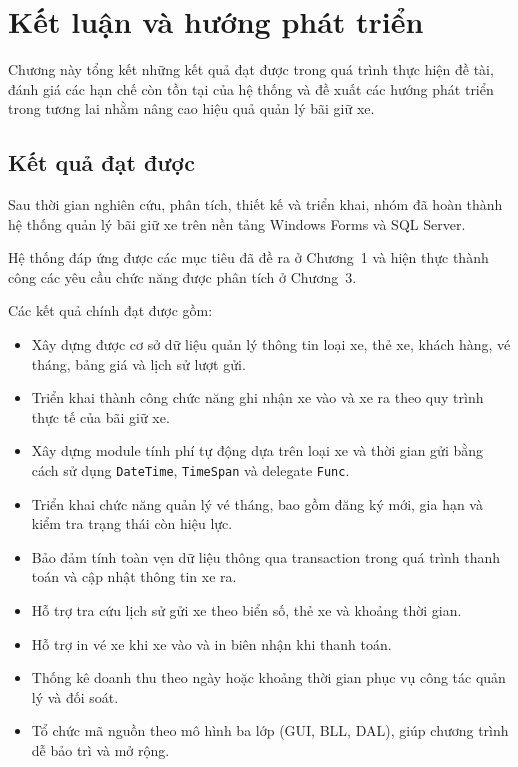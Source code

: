 \chapter{Kết luận và hướng phát triển}


Chương này tổng kết những kết quả đạt được trong quá trình thực hiện
đề tài, đánh giá các hạn chế còn tồn tại của hệ thống và đề xuất các
hướng phát triển trong tương lai nhằm nâng cao hiệu quả quản lý
bãi giữ xe.

\section{Kết quả đạt được}

Sau thời gian nghiên cứu, phân tích, thiết kế và triển khai, nhóm đã
hoàn thành hệ thống quản lý bãi giữ xe trên nền tảng Windows Forms
và SQL Server.

Hệ thống đáp ứng được các mục tiêu đã đề ra ở Chương~1 và hiện thực
thành công các yêu cầu chức năng được phân tích ở Chương~3.

Các kết quả chính đạt được gồm:

\begin{itemize}
    \item Xây dựng được cơ sở dữ liệu quản lý thông tin loại xe,
    thẻ xe, khách hàng, vé tháng, bảng giá và lịch sử lượt gửi.

    \item Triển khai thành công chức năng ghi nhận xe vào và xe ra
    theo quy trình thực tế của bãi giữ xe.

    \item Xây dựng module tính phí tự động dựa trên loại xe và thời
    gian gửi bằng cách sử dụng \texttt{DateTime}, \texttt{TimeSpan}
    và delegate \texttt{Func}.

    \item Triển khai chức năng quản lý vé tháng, bao gồm đăng ký mới,
    gia hạn và kiểm tra trạng thái còn hiệu lực.

    \item Bảo đảm tính toàn vẹn dữ liệu thông qua transaction trong
    quá trình thanh toán và cập nhật thông tin xe ra.

    \item Hỗ trợ tra cứu lịch sử gửi xe theo biển số, thẻ xe và
    khoảng thời gian.

    \item Hỗ trợ in vé xe khi xe vào và in biên nhận khi thanh toán.

    \item Thống kê doanh thu theo ngày hoặc khoảng thời gian phục vụ
    công tác quản lý và đối soát.

    \item Tổ chức mã nguồn theo mô hình ba lớp (GUI, BLL, DAL),
    giúp chương trình dễ bảo trì và mở rộng.
\end{itemize}

